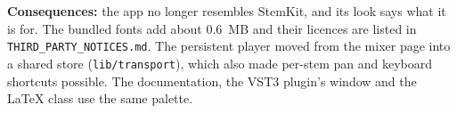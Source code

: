 \textbf{Consequences:} the app no longer resembles StemKit, and its look
says what it is for. The bundled fonts add about 0.6~MB and their licences are
listed in \texttt{THIRD\_PARTY\_NOTICES.md}. The persistent player moved from
the mixer page into a shared store (\texttt{lib/transport}), which also made
per-stem pan and keyboard shortcuts possible. The documentation, the VST3
plugin's window and the LaTeX class use the same palette.
